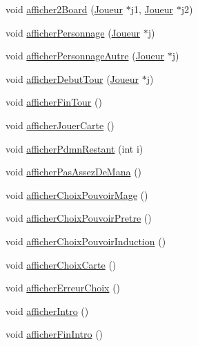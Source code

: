 \begin{DoxyCompactItemize}
\item 
void \hyperlink{class_vue_console_af493448120cfaf5c389f741e30bc7b31}{afficher2\-Board} (\hyperlink{class_joueur}{\-Joueur} $\ast$j1, \hyperlink{class_joueur}{\-Joueur} $\ast$j2)
\item 
void \hyperlink{class_vue_console_ad450cc024c4c7797c18f399b0f4c321c}{afficher\-Personnage} (\hyperlink{class_joueur}{\-Joueur} $\ast$j)
\item 
void \hyperlink{class_vue_console_ae015f7453d65bb89abef4793addc18ca}{afficher\-Personnage\-Autre} (\hyperlink{class_joueur}{\-Joueur} $\ast$j)
\item 
void \hyperlink{class_vue_console_a64ad6e083263f0fadef29b98207cb2aa}{afficher\-Debut\-Tour} (\hyperlink{class_joueur}{\-Joueur} $\ast$j)
\item 
void \hyperlink{class_vue_console_ada125e06218ee32a5dbacc526e28a84c}{afficher\-Fin\-Tour} ()
\item 
void \hyperlink{class_vue_console_a0f4cab13a73ac5c80881276687a506aa}{afficher\-Jouer\-Carte} ()
\item 
void \hyperlink{class_vue_console_a9f1b65a45e8e3da31ae35fa6c4d53dce}{afficher\-Pdmn\-Restant} (int i)
\item 
void \hyperlink{class_vue_console_a2b469256d2776aa6e01ebc4bd393c2a3}{afficher\-Pas\-Assez\-De\-Mana} ()
\item 
void \hyperlink{class_vue_console_a525f3eacad711387238b37a9b64c5406}{afficher\-Choix\-Pouvoir\-Mage} ()
\item 
void \hyperlink{class_vue_console_ac1e6d5da6ce2c352d10c665d79c616d0}{afficher\-Choix\-Pouvoir\-Pretre} ()
\item 
void \hyperlink{class_vue_console_a884aeedbd65ebe011b86f42d6ae5db04}{afficher\-Choix\-Pouvoir\-Induction} ()
\item 
void \hyperlink{class_vue_console_ad55bf2d0d6397204cccfb488aad39c4e}{afficher\-Choix\-Carte} ()
\item 
void \hyperlink{class_vue_console_a2f811063bc7f2dcac117d7a49df36931}{afficher\-Erreur\-Choix} ()
\item 
void \hyperlink{class_vue_console_a1e9faf3a19588ff0f659dfff4cfcff09}{afficher\-Intro} ()
\item 
void \hyperlink{class_vue_console_a945e04f68fb5a0089e35b1b688001b87}{afficher\-Fin\-Intro} ()
\end{DoxyCompactItemize}


